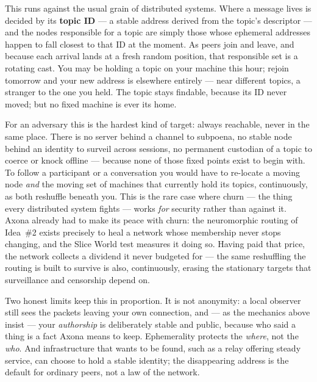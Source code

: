 \documentclass[nobib,justified]{tufte-handout}
\begin{document}
This runs against the usual grain of distributed systems. Where a message lives
is decided by its \textbf{topic ID} --- a stable address derived from the
topic's descriptor --- and the nodes responsible for a topic are simply those
whose ephemeral addresses happen to fall closest to that ID at the moment. As
peers join and leave, and because each arrival lands at a fresh random position,
that responsible set is a rotating cast. You may be holding a topic on your
machine this hour; rejoin tomorrow and your new address is elsewhere entirely
--- near different topics, a stranger to the one you held. The topic stays
findable, because its ID never moved; but no fixed machine is ever its home.

For an adversary this is the hardest kind of target: always reachable, never in
the same place. There is no server behind a channel to subpoena, no stable node
behind an identity to surveil across sessions, no permanent custodian of a topic
to coerce or knock offline --- because none of those fixed points exist to begin
with. To follow a participant or a conversation you would have to re-locate a
moving node \emph{and} the moving set of machines that currently hold its
topics, continuously, as both reshuffle beneath you. This is the rare case where
churn --- the thing every distributed system fights --- works \emph{for}
security rather than against it. Axona already had to make its peace with churn:
the neuromorphic routing of Idea~\#2 exists precisely to heal a network whose
membership never stops changing, and the Slice World test measures it doing so.
Having paid that price, the network collects a dividend it never budgeted for
--- the same reshuffling the routing is built to survive is also, continuously,
erasing the stationary targets that surveillance and censorship depend on.

Two honest limits keep this in proportion. It is not anonymity: a local observer
still sees the packets leaving your own connection, and --- as the mechanics
above insist --- your \emph{authorship} is deliberately stable and public,
because who said a thing is a fact Axona means to keep. Ephemerality protects the
\emph{where}, not the \emph{who}. And infrastructure that wants to be found, such
as a relay offering steady service, can choose to hold a stable identity; the
disappearing address is the default for ordinary peers, not a law of the network.

\end{document}
